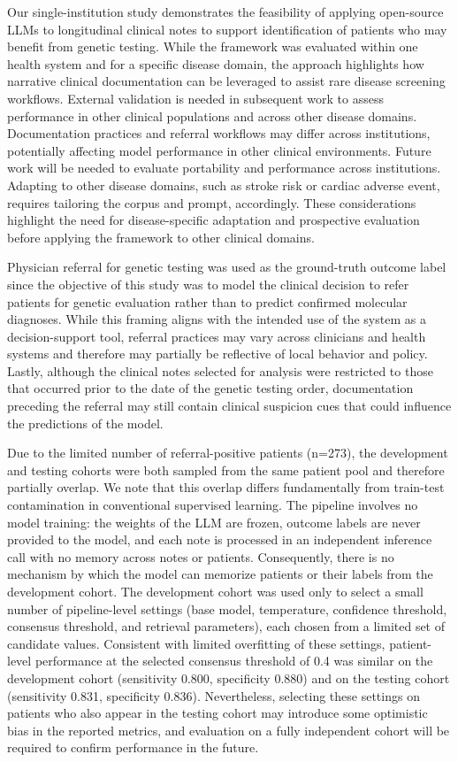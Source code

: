 \documentclass[fleqn,10pt]{wlscirep}
\begin{document}
Our single-institution study demonstrates the feasibility of applying open-source LLMs to longitudinal clinical notes to support identification of patients who may benefit from genetic testing. While the framework was evaluated within one health system and for a specific disease domain, the approach highlights how narrative clinical documentation can be leveraged to assist rare disease screening workflows. External validation is needed in subsequent work to assess performance in other clinical populations and across other disease domains. Documentation practices and referral workflows may differ across institutions, potentially affecting model performance in other clinical environments. Future work will be needed to evaluate portability and performance across institutions. Adapting to other disease domains, such as stroke risk or cardiac adverse event, requires tailoring the corpus and prompt, accordingly. These considerations highlight the need for disease-specific adaptation and prospective evaluation before applying the framework to other clinical domains.

Physician referral for genetic testing was used as the ground-truth outcome label since the objective of this study was to model the clinical decision to refer patients for genetic evaluation rather than to predict confirmed molecular diagnoses. While this framing aligns with the intended use of the system as a decision-support tool, referral practices may vary across clinicians and health systems and therefore may partially be reflective of local behavior and policy. Lastly, although the clinical notes selected for analysis were restricted to those that occurred prior to the date of the genetic testing order, documentation preceding the referral may still contain clinical suspicion cues that could influence the predictions of the model. 

Due to the limited number of referral-positive patients (n=273), the development and testing cohorts were both sampled from the same patient pool and therefore partially overlap. We note that this overlap differs fundamentally from train-test contamination in conventional supervised learning. The pipeline involves no model training: the weights of the LLM are frozen, outcome labels are never provided to the model, and each note is processed in an independent inference call with no memory across notes or patients. Consequently, there is no mechanism by which the model can memorize patients or their labels from the development cohort. The development cohort was used only to select a small number of pipeline-level settings (base model, temperature, confidence threshold, consensus threshold, and retrieval parameters), each chosen from a limited set of candidate values. Consistent with limited overfitting of these settings, patient-level performance at the selected consensus threshold of 0.4 was similar on the development cohort (sensitivity 0.800, specificity 0.880) and on the testing cohort (sensitivity 0.831, specificity 0.836). Nevertheless, selecting these settings on patients who also appear in the testing cohort may introduce some optimistic bias in the reported metrics, and evaluation on a fully independent cohort will be required to confirm performance in the future.
\end{document}
